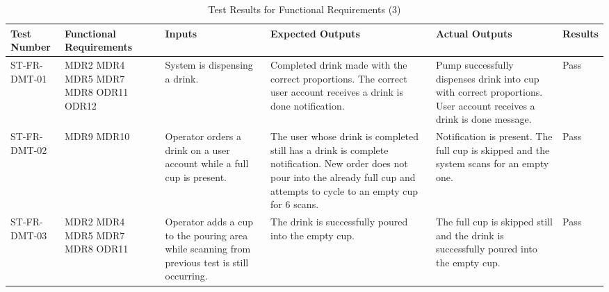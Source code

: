 \documentclass[12pt, titlepage]{article}
\begin{document}
    \begin{rotate}{}
    
    \begin{landscape}
        \begin{table}
           \begin{tabular}{|p{2.75cm}|p{2.5cm}|p{4cm}|p{4.75cm}|p{4.25cm}|p{1.5cm}|}
            \hline
            Test Number & Functional \newline Requirements & Inputs & Expected Outputs & Actual Outputs & Results  \\ [0.5ex]
            \hline\hline
            ST-FR-DMT-01 & MDR2 \newline MDR4 \newline MDR5 \newline MDR7 \newline MDR8 \newline ODR11 \newline ODR12 & System is dispensing a drink. & Completed drink made with the correct proportions. The correct user account receives a drink is done notification. & Pump successfully dispenses drink into cup with correct proportions. User account receives a drink is done message.  & Pass \\
            \hline
            ST-FR-DMT-02 & MDR9 \newline MDR10 & Operator orders a drink on a user account while a full cup is present. & The user whose drink is completed still has a drink is complete notification. New order does not pour into the already full cup and attempts to cycle to an empty cup for 6 scans. & Notification is present. The full cup is skipped and the system scans for an empty one. & Pass \\
            \hline
            ST-FR-DMT-03 & MDR2 \newline MDR4 \newline MDR5 \newline MDR7 \newline MDR8 \newline ODR11 & Operator adds a cup to the pouring area while scanning from previous test is still occurring. & The drink is successfully poured into the empty cup. & The full cup is skipped still and the drink is successfully poured into the empty cup. & Pass \\
            \hline
            \end{tabular}
            \caption{Test Results for Functional Requirements (3)}
            \label{tab: caption}
        \end{table}
     \end{landscape}
    \end{rotate}            
\end{document}
